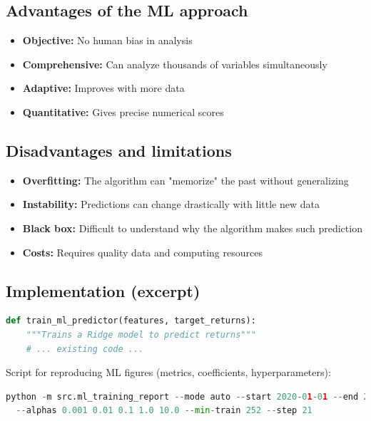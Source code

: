 \documentclass[11pt,a4paper]{article}
\begin{document}
\subsection{Advantages of the ML approach}
\begin{itemize}
\item \textbf{Objective:} No human bias in analysis
\item \textbf{Comprehensive:} Can analyze thousands of variables simultaneously
\item \textbf{Adaptive:} Improves with more data
\item \textbf{Quantitative:} Gives precise numerical scores
\end{itemize}

\subsection{Disadvantages and limitations}
\begin{itemize}
\item \textbf{Overfitting:} The algorithm can "memorize" the past without generalizing
\item \textbf{Instability:} Predictions can change drastically with little new data
\item \textbf{Black box:} Difficult to understand why the algorithm makes such prediction
\item \textbf{Costs:} Requires quality data and computing resources
\end{itemize}

\subsection{Implementation (excerpt)}
\begin{lstlisting}[language=Python,caption={ML Ridge - File: \texttt{src/ml\_predictor.py}}]
def train_ml_predictor(features, target_returns):
    """Trains a Ridge model to predict returns"""
    # ... existing code ...
\end{lstlisting}
\noindent Script for reproducing ML figures (metrics, coefficients, hyperparameters):
\begin{lstlisting}[language=Python,caption={ML training report — File: \texttt{src/ml\_training\_report.py}}]
python -m src.ml_training_report --mode auto --start 2020-01-01 --end 2023-12-31 \\
  --alphas 0.001 0.01 0.1 1.0 10.0 --min-train 252 --step 21
\end{lstlisting}
\end{document}
